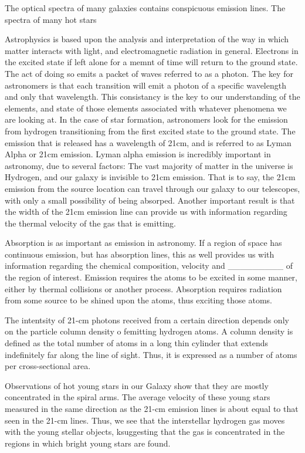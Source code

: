 The optical spectra of many galaxies contains conspicuous emission lines. The spectra of many hot stars



Astrophysics is based upon the analysis and interpretation of the way in which matter interacts with light, and electromagnetic radiation in general. 
Electrons in the excited state if left alone for a memnt of time will return to the ground state. The act of doing so emits a packet of waves referred to as a photon. 
The key for astronomers is that each transition will emit a photon of a specific wavelength and only that wavelength. 
This consistancy is the key to our understanding of the elements, and state of those elements associated with whatever phenomena we are looking at. 
In the case of star formation, astronomers look for the emission from hydrogen transitioning from the first excited state to the ground state. 
The emission that is released has a wavelength of 21cm, and is referred to as Lyman Alpha or 21cm emission. 
Lyman alpha emission is incredibly important in astronomy, due to several factors: 
The vast majority of matter in the universe is Hydrogen, and our galaxy is invisible to 21cm emission. 
That is to say, the 21cm emission from the source location can travel through our galaxy to our telescopes, with only a small possibility of being absorped. 
Another important result is that the width of the 21cm emission line can provide us with information regarding the thermal velocity of the gas that is emitting. 

Absorption is as important as emission in astronomy. 
If a region of space has continuous emission, but has absorption lines, this as well provides us with information 
regarding the chemical composition, velocity and _________ of the region of interest. 
Emission requires the atoms to be excited in some manner, either by thermal collisions or another process.
Absorption requires radiation from some source to be shined upon the atoms, thus exciting those atoms. 



The intentsity of 21-cm photons received from a certain direction depends only on the particle column density o femitting hydrogen atoms.
 A column density is defined as the total number of atoms in a long thin cylinder that extends indefinitely far along the line of sight. 
Thus, it is expressed as a number of atoms per cross-sectional area. 

Observations of hot young stars in our Galaxy show that they are mostly concentrated in the spiral arms. 
The average velocity of these young stars measured in the same direction as the 21-cm emission lines is about equal to that seen in the 21-cm lines. 
Thus, we see that the interstellar hydrogen gas moves with the young stellar objects, ksuggesting that the gas is concentrated in the regions in which bright young stars are found. 

